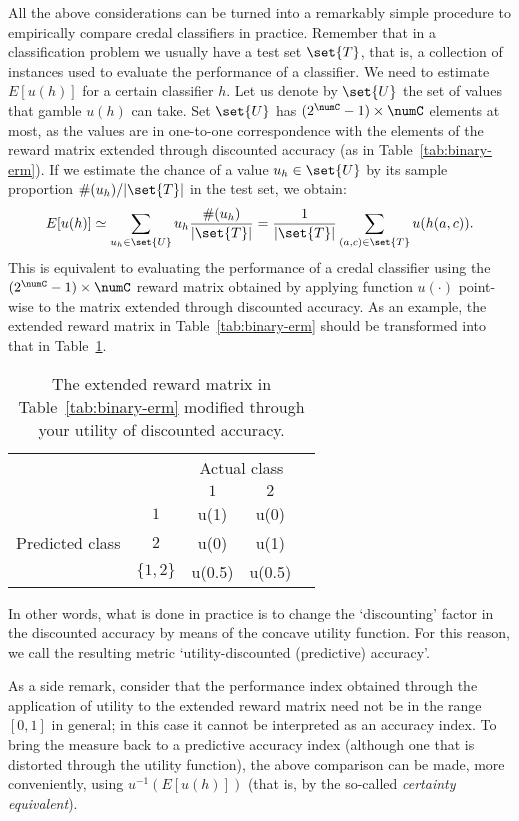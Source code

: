 \documentclass[a4paper,10pt,reqno]{amsart}
\theoremstyle{remark}
\begin{document}
All the above considerations can be turned into a remarkably simple procedure to empirically compare credal classifiers in practice. Remember that in a classification problem we usually have a test set $\set{T}$, that is, a collection of instances used to evaluate the performance of a classifier. We need to estimate $E[u(h)]$ for a certain classifier $h$. Let us denote by $\set{U}$ the set of values that gamble $u(h)$ can take. Set $\set{U}$ has $(2^{\numC}-1)\times\numC$ elements at most, as the values are in one-to-one correspondence with the elements of the reward matrix extended through discounted accuracy (as in Table~\ref{tab:binary-erm}). If we estimate the chance of a value $u_h\in\set{U}$ by its sample proportion $\#(u_h)/|\set{T}|$ in the test set, we obtain:
\begin{equation*}
E[u(h)]\simeq\sum_{u_h\in\set{U}}u_h\frac{\#(u_h)}{|\set{T}|}=\frac{1}{|\set{T}|}\sum_{(a,c)\in\set{T}}u(h(a,c)).
\end{equation*}
This is equivalent to evaluating the performance of a credal classifier using the $(2^{\numC}-1)\times\numC$ reward matrix obtained by applying function $u(\cdot)$ point-wise to the matrix extended through discounted accuracy. As an example, the extended reward matrix in Table~\ref{tab:binary-erm} should be transformed into that in Table~\ref{tab:binary-u(erm)}.
\begin{table}[htp]
  \centering
\begin{tabular}{cc|ccc}
& & \multicolumn{2}{c}{Actual class} \\ %
& & $1$ & $2$ \\ \cline{1-4}
\multicolumn{1}{c}{\multirow{3}{*}{Predicted class}} &
\multicolumn{1}{c|}{$1$} & u(1) & u(0)     \\ %
\multicolumn{1}{c}{} &
\multicolumn{1}{c|}{$2$} & u(0) & u(1)\\ %
\multicolumn{1}{c}{}&{$\{1,2\}$} & u(0.5) & u(0.5)
\end{tabular}
  \caption{The extended reward matrix in Table~\ref{tab:binary-erm} modified through your utility of discounted accuracy.}
  \label{tab:binary-u(erm)}
\end{table}
In other words, what is done in practice is to change the `discounting' factor in the discounted accuracy by means of the concave utility function. For this reason, we call the resulting metric `utility-discounted (predictive) accuracy'.

As a side remark, consider that the performance index obtained through the application of utility to the extended reward matrix need not be in the range $[0,1]$ in general; in this case it cannot be interpreted as an accuracy index. To bring the measure back to a predictive accuracy index (although one that is distorted through the utility function), the above comparison can be made, more conveniently, using $u^{-1}(E[u(h)])$ (that is, by the so-called \emph{certainty equivalent}). 
\end{document}
